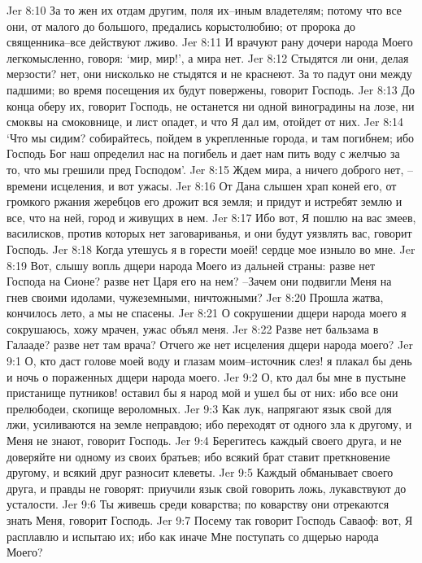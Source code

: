 Jer 8:10  За то жен их отдам другим, поля их--иным владетелям; потому что все они, от малого до большого, предались корыстолюбию; от пророка до священника--все действуют лживо.
Jer 8:11  И врачуют рану дочери народа Моего легкомысленно, говоря: `мир, мир!', а мира нет.
Jer 8:12  Стыдятся ли они, делая мерзости? нет, они нисколько не стыдятся и не краснеют. За то падут они между падшими; во время посещения их будут повержены, говорит Господь.
Jer 8:13  До конца оберу их, говорит Господь, не останется ни одной виноградины на лозе, ни смоквы на смоковнице, и лист опадет, и что Я дал им, отойдет от них.
Jer 8:14  `Что мы сидим? собирайтесь, пойдем в укрепленные города, и там погибнем; ибо Господь Бог наш определил нас на погибель и дает нам пить воду с желчью за то, что мы грешили пред Господом'.
Jer 8:15  Ждем мира, а ничего доброго нет, --времени исцеления, и вот ужасы.
Jer 8:16  От Дана слышен храп коней его, от громкого ржания жеребцов его дрожит вся земля; и придут и истребят землю и все, что на ней, город и живущих в нем.
Jer 8:17  Ибо вот, Я пошлю на вас змеев, василисков, против которых нет заговариванья, и они будут уязвлять вас, говорит Господь.
Jer 8:18  Когда утешусь я в горести моей! сердце мое изныло во мне.
Jer 8:19  Вот, слышу вопль дщери народа Моего из дальней страны: разве нет Господа на Сионе? разве нет Царя его на нем? --Зачем они подвигли Меня на гнев своими идолами, чужеземными, ничтожными?
Jer 8:20  Прошла жатва, кончилось лето, а мы не спасены.
Jer 8:21  О сокрушении дщери народа моего я сокрушаюсь, хожу мрачен, ужас объял меня.
Jer 8:22  Разве нет бальзама в Галааде? разве нет там врача? Отчего же нет исцеления дщери народа моего?
Jer 9:1  О, кто даст голове моей воду и глазам моим--источник слез! я плакал бы день и ночь о пораженных дщери народа моего.
Jer 9:2  О, кто дал бы мне в пустыне пристанище путников! оставил бы я народ мой и ушел бы от них: ибо все они прелюбодеи, скопище вероломных.
Jer 9:3  Как лук, напрягают язык свой для лжи, усиливаются на земле неправдою; ибо переходят от одного зла к другому, и Меня не знают, говорит Господь.
Jer 9:4  Берегитесь каждый своего друга, и не доверяйте ни одному из своих братьев; ибо всякий брат ставит преткновение другому, и всякий друг разносит клеветы.
Jer 9:5  Каждый обманывает своего друга, и правды не говорят: приучили язык свой говорить ложь, лукавствуют до усталости.
Jer 9:6  Ты живешь среди коварства; по коварству они отрекаются знать Меня, говорит Господь.
Jer 9:7  Посему так говорит Господь Саваоф: вот, Я расплавлю и испытаю их; ибо как иначе Мне поступать со дщерью народа Моего?
